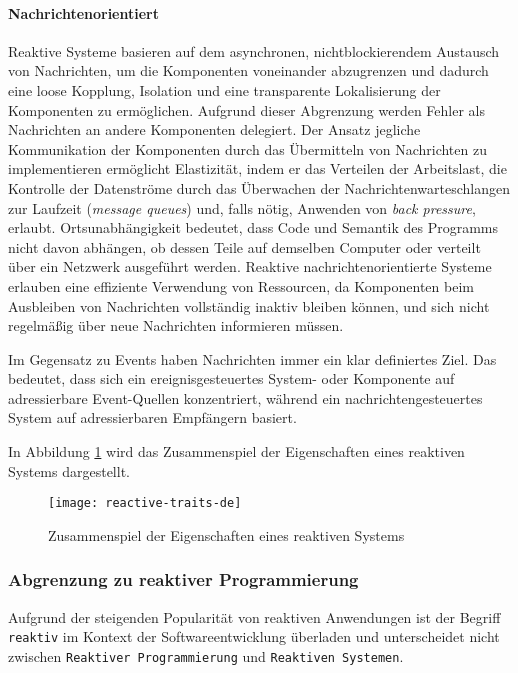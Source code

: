 \paragraph{Nachrichtenorientiert}Reaktive Systeme basieren auf dem asynchronen, nichtblockierendem Austausch von Nachrichten, um die Komponenten voneinander
abzugrenzen und dadurch eine loose Kopplung, Isolation und eine transparente Lokalisierung der Komponenten zu ermöglichen.
Aufgrund dieser Abgrenzung werden Fehler als Nachrichten an andere Komponenten delegiert.
Der Ansatz jegliche Kommunikation der Komponenten durch das Übermitteln von Nachrichten zu implementieren ermöglicht Elastizität,
indem er das Verteilen der Arbeitslast, die Kontrolle der Datenströme durch das Überwachen der Nachrichtenwarteschlangen zur Laufzeit
(\textit{message queues}) und, falls nötig, Anwenden von \textit{back pressure}, erlaubt.
Ortsunabhängigkeit bedeutet, dass Code und Semantik des Programms nicht davon abhängen, ob dessen Teile auf demselben Computer
oder verteilt über ein Netzwerk ausgeführt werden.
Reaktive nachrichtenorientierte Systeme erlauben eine effiziente Verwendung von Ressourcen, da Komponenten beim Ausbleiben von
Nachrichten vollständig inaktiv bleiben können, und sich nicht regelmäßig über neue Nachrichten informieren müssen.\parencite{ReactiveSystems}

Im Gegensatz zu Events haben Nachrichten immer ein klar definiertes Ziel.
Das bedeutet, dass sich ein ereignisgesteuertes System- oder Komponente auf adressierbare Event-Quellen konzentriert,
während ein nachrichtengesteuertes System auf adressierbaren Empfängern basiert.

In Abbildung \ref{fig:reactive-traits} wird das Zusammenspiel der Eigenschaften eines reaktiven Systems dargestellt.

\begin{figure}[ht!]
    \centering
    \texttt{[image: reactive-traits-de]}
    \caption{Zusammenspiel der Eigenschaften eines reaktiven Systems \parencite{ReactiveSystems}}
    \label{fig:reactive-traits}
\end{figure}
\newpage
\subsubsection{Abgrenzung zu reaktiver Programmierung}
\label{subsubsection:abgrenzung_reaktive_programmierung}
Aufgrund der steigenden Popularität von reaktiven Anwendungen ist der Begriff \verb|reaktiv| im Kontext der Softwareentwicklung
überladen und unterscheidet nicht zwischen \linebreak\verb|Reaktiver Programmierung| und \verb|Reaktiven Systemen|.

